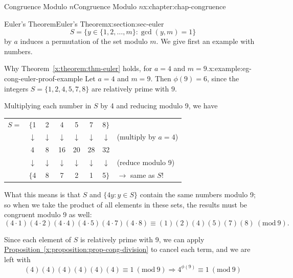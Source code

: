 \documentclass[oneside,10pt,]{book}
\newcommand{\tabularfont}{\relax}
\newcommand{\xreffont}{\relax}
\numberwithin{equation}{section}
\newcommand{\Mod}[1]{\ \left(\mathrm{mod}\ #1\right)}
\begin{document}
\begin{chapterptx}{Congruence Modulo \(n\)}{}{Congruence Modulo \(n\)}{}{}{x:chapter:chap-congruence}
\begin{sectionptx}{Euler's Theorem}{}{Euler's Theorem}{}{}{x:section:sec-euler}
\begin{equation*}
S = \{y \in \{1,2,\ldots,m\} : \gcd(y,m) = 1\}
\end{equation*}
by \(a\) induces a permutation of the set modulo \(m\). We give first an example with numbers.%
\begin{example}{Why Theorem~{\xreffont\ref*{x:theorem:thm-euler}} holds, for \(a = 4\) and \(m = 9\).}{x:example:eg-cong-euler-proof-example}%
Let \(a = 4\) and \(m = 9\). Then \(\phi(9) = 6\), since the integers \(S = \{1,2,4,5,7,8\}\) are relatively prime with \(9\).%
\par
Multiplying each number in \(S\) by 4 and reducing modulo 9, we have%
\begin{sidebyside}{1}{0.125}{0.125}{0}%
\begin{sbspanel}{0.75}%
{\centering%
{\tabularfont%
\begin{tabular}{cccccccc}
\multicolumn{1}{r}{\(S = \)}&\(\{\)1&2&4&5&7&8\(\}\)&\multicolumn{1}{l}{}\tabularnewline[0pt]
\multicolumn{1}{r}{}&\(\downarrow\)&\(\downarrow\)&\(\downarrow\)&\(\downarrow\)&\(\downarrow\)&\(\downarrow\)&\multicolumn{1}{l}{(multiply by \(a = 4\))}\tabularnewline[0pt]
\multicolumn{1}{r}{}&4&8&16&20&28&32&\multicolumn{1}{l}{}\tabularnewline[0pt]
\multicolumn{1}{r}{}&\(\downarrow\)&\(\downarrow\)&\(\downarrow\)&\(\downarrow\)&\(\downarrow\)&\(\downarrow\)&\multicolumn{1}{l}{(reduce modulo 9)}\tabularnewline[0pt]
\multicolumn{1}{r}{}&\(\{\)4&8&7&2&1&5\(\}\)&\multicolumn{1}{l}{\(\rightarrow\) same as \(S\)!}
\end{tabular}
}%
\par}
\end{sbspanel}%
\end{sidebyside}%
\par
What this means is that \(S\) and \(\{4y : y \in S\}\) contain the same numbers modulo 9; so when we take the product of all elements in these sets, the results must be congruent modulo 9 as well:%
\begin{equation*}
(4\cdot 1)(4\cdot 2)(4\cdot 4)(4 \cdot 5)(4\cdot 7)(4\cdot 8) \equiv (1)(2)(4)(5)(7)(8)\Mod{9}\text{.}
\end{equation*}
%
\par
Since each element of \(S\) is relatively prime with 9, we can apply \hyperref[x:proposition:prop-cong-division]{Proposition~{\xreffont\ref{x:proposition:prop-cong-division}}} to cancel each term, and we are left with%
\begin{equation*}
(4)(4)(4)(4)(4)(4) \equiv 1 \Mod{9} \Rightarrow 4^{\phi(9)} \equiv 1 \Mod{9}

\end{equation*}
\end{example}
\end{sectionptx}
\end{chapterptx}
\end{document}
